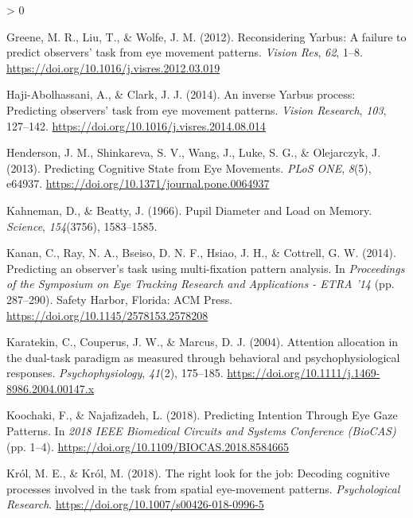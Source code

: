 \documentclass[
  english,
  man, donotrepeattitle,floatsintext]{apa6}
\newlength{\cslhangindent}
\newenvironment{CSLReferences}[2] %
 {%
  \setlength{\parindent}{0pt}
  \ifodd #1 \everypar{\setlength{\hangindent}{\cslhangindent}}\ignorespaces\fi
  \ifnum #2 > 0
  \setlength{\parskip}{#2\baselineskip}
  \fi
 }%
 {}
\begin{document}
\begin{CSLReferences}{1}{0}
\leavevmode\hypertarget{ref-greeneReconsideringYarbusFailure2012c}{}%
Greene, M. R., Liu, T., \& Wolfe, J. M. (2012). Reconsidering {Yarbus}: {A} failure to predict observers' task from eye movement patterns. \emph{Vision Res}, \emph{62}, 1--8. \url{https://doi.org/10.1016/j.visres.2012.03.019}

\leavevmode\hypertarget{ref-haji-abolhassaniInverseYarbusProcess2014c}{}%
Haji-Abolhassani, A., \& Clark, J. J. (2014). An inverse {Yarbus} process: {Predicting} observers' task from eye movement patterns. \emph{Vision Research}, \emph{103}, 127--142. \url{https://doi.org/10.1016/j.visres.2014.08.014}

\leavevmode\hypertarget{ref-hendersonPredictingCognitiveState2013c}{}%
Henderson, J. M., Shinkareva, S. V., Wang, J., Luke, S. G., \& Olejarczyk, J. (2013). Predicting {Cognitive State} from {Eye Movements}. \emph{PLoS ONE}, \emph{8}(5), e64937. \url{https://doi.org/10.1371/journal.pone.0064937}

\leavevmode\hypertarget{ref-kahnemanPupilDiameterLoad1966}{}%
Kahneman, D., \& Beatty, J. (1966). Pupil {Diameter} and {Load} on {Memory}. \emph{Science}, \emph{154}(3756), 1583--1585.

\leavevmode\hypertarget{ref-kananPredictingObserverTask2014a}{}%
Kanan, C., Ray, N. A., Bseiso, D. N. F., Hsiao, J. H., \& Cottrell, G. W. (2014). Predicting an observer's task using multi-fixation pattern analysis. In \emph{Proceedings of the {Symposium} on {Eye Tracking Research} and {Applications} - {ETRA} '14} (pp. 287--290). {Safety Harbor, Florida}: {ACM Press}. \url{https://doi.org/10.1145/2578153.2578208}

\leavevmode\hypertarget{ref-karatekinAttentionAllocationDualtask2004}{}%
Karatekin, C., Couperus, J. W., \& Marcus, D. J. (2004). Attention allocation in the dual-task paradigm as measured through behavioral and psychophysiological responses. \emph{Psychophysiology}, \emph{41}(2), 175--185. \url{https://doi.org/10.1111/j.1469-8986.2004.00147.x}

\leavevmode\hypertarget{ref-koochakiPredictingIntentionEye2018a}{}%
Koochaki, F., \& Najafizadeh, L. (2018). Predicting {Intention Through Eye Gaze Patterns}. In \emph{2018 {IEEE Biomedical Circuits} and {Systems Conference} ({BioCAS})} (pp. 1--4). \url{https://doi.org/10.1109/BIOCAS.2018.8584665}

\leavevmode\hypertarget{ref-krolRightLookJob2018a}{}%
Król, M. E., \& Król, M. (2018). The right look for the job: {Decoding} cognitive processes involved in the task from spatial eye-movement patterns. \emph{Psychological Research}. \url{https://doi.org/10.1007/s00426-018-0996-5}


\end{CSLReferences}
\end{document}

